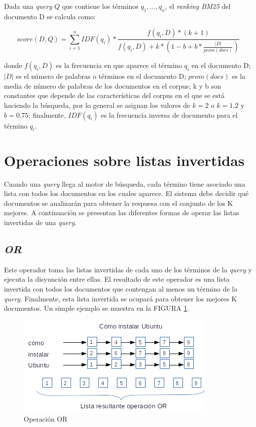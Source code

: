 Dada una \textit{query} $Q$ que contiene los términos $q_{1},...,q_{n}$, el \textit{ranking BM25} del documento D se calcula como: 

$$ score(D,Q) =  \displaystyle\sum_{i=1}^n IDF(q_{i}) * \frac{f(q_{i},D)*(k+1)}{f(q_{i},D)+k * (1 - b + b * \frac{|D|}{prom(docs)})} $$

donde $f(q_{i}, D)$ es la frecuencia en que aparece el término $q_{i}$ en el documento D; $|D|$ es el número de palabras o términos en el documento D; $prom(docs)$ es la media de número de palabras de los documentos en el corpus; k y b son constantes que depende de las características del corpus en el que se está haciendo la búsqueda, por lo general se asignan los valores de $k = 2$ o $k = 1.2$ y $b = 0.75$; finalmente, $IDF(q_{i})$ es la frecuencia inversa de documento para el término $q_{i}$.


\section{Operaciones sobre listas invertidas}
\label{marco:osli}
Cuando una \textit{query} llega al motor de búsqueda, cada término tiene asociado una lista con todos los documentos en los cuales aparece. El sistema debe decidir qué documentos se analizarán para obtener la respuesa con el conjunto de los K mejores.
A continuación se presentan las diferentes formas de operar las listas invertidas de una \textit{query}.

\subsection{\textit{OR}}
\label{marco:or}
Este operador toma las listas invertidas de cada uno de los términos de la \textit{query} y ejecuta la disyunción entre ellas. El resultado de este operador es una lista invertida con todos los documentos que contengan al menos un término de la \textit{query}. Finalmente, esta lista invertida se ocupará para obtener los mejores K documentos. Un simple ejemplo se muestra en la FIGURA \ref{fig:ORoperation}.

\begin{figure}[tp]
\centering
\includegraphics[scale=.75]{images/ORoperation.png}
\caption{Operaci\'on OR}
\label{fig:ORoperation}
\end{figure}

